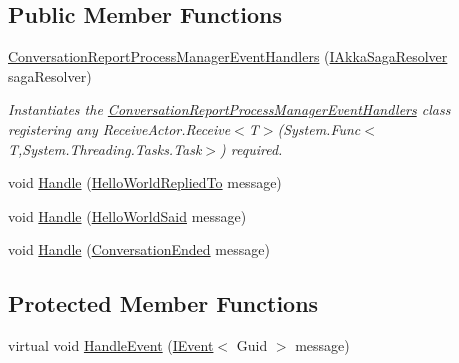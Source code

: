 \subsection*{Public Member Functions}
\begin{DoxyCompactItemize}
\item 
\hyperlink{classCqrs_1_1Akka_1_1Tests_1_1Unit_1_1Sagas_1_1ConversationReportProcessManagerEventHandlers_a0b35d652189d6194ff5893ff114293e0}{Conversation\+Report\+Process\+Manager\+Event\+Handlers} (\hyperlink{interfaceCqrs_1_1Akka_1_1Domain_1_1IAkkaSagaResolver}{I\+Akka\+Saga\+Resolver} saga\+Resolver)
\begin{DoxyCompactList}\small\item\em Instantiates the \hyperlink{classCqrs_1_1Akka_1_1Tests_1_1Unit_1_1Sagas_1_1ConversationReportProcessManagerEventHandlers}{Conversation\+Report\+Process\+Manager\+Event\+Handlers} class registering any Receive\+Actor.\+Receive$<$\+T$>$(\+System.\+Func$<$\+T,\+System.\+Threading.\+Tasks.\+Task$>$) required. \end{DoxyCompactList}\item 
void \hyperlink{classCqrs_1_1Akka_1_1Tests_1_1Unit_1_1Sagas_1_1ConversationReportProcessManagerEventHandlers_a0a40389673be0983b56d65eeaa54bff9}{Handle} (\hyperlink{classCqrs_1_1Akka_1_1Tests_1_1Unit_1_1Events_1_1HelloWorldRepliedTo}{Hello\+World\+Replied\+To} message)
\item 
void \hyperlink{classCqrs_1_1Akka_1_1Tests_1_1Unit_1_1Sagas_1_1ConversationReportProcessManagerEventHandlers_a2dab5ed936f713ae25786ab905103f59}{Handle} (\hyperlink{classCqrs_1_1Akka_1_1Tests_1_1Unit_1_1Events_1_1HelloWorldSaid}{Hello\+World\+Said} message)
\item 
void \hyperlink{classCqrs_1_1Akka_1_1Tests_1_1Unit_1_1Sagas_1_1ConversationReportProcessManagerEventHandlers_a8d31b621db17f2beba78e98a0040f384}{Handle} (\hyperlink{classCqrs_1_1Akka_1_1Tests_1_1Unit_1_1Events_1_1ConversationEnded}{Conversation\+Ended} message)
\end{DoxyCompactItemize}
\subsection*{Protected Member Functions}
\begin{DoxyCompactItemize}
\item 
virtual void \hyperlink{classCqrs_1_1Akka_1_1Tests_1_1Unit_1_1Sagas_1_1ConversationReportProcessManagerEventHandlers_a51207786638b00eaae1cae24d0053822}{Handle\+Event} (\hyperlink{interfaceCqrs_1_1Events_1_1IEvent}{I\+Event}$<$ Guid $>$ message)
\end{DoxyCompactItemize}
